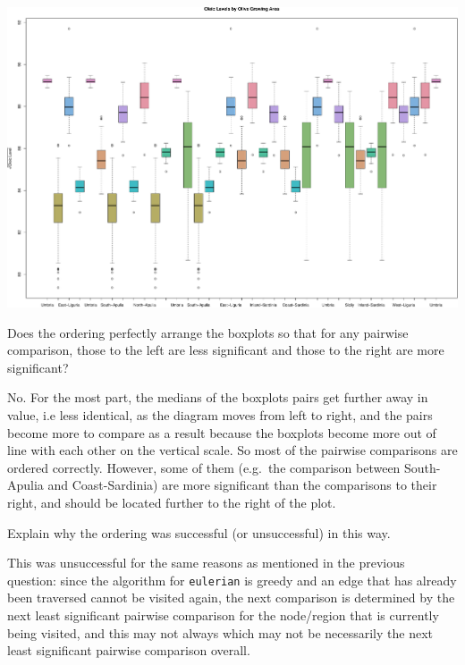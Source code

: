 \documentclass[9pt,letter]{article}
\begin{document}
\begin{center}\includegraphics{a4_solutions_files/figure-latex/unnamed-chunk-18-1} \end{center}

\item 

Does the ordering perfectly arrange the boxplots so that for any
pairwise comparison, those to the left are less significant and those to
the right are more significant?

No. For the most part, the medians of the boxplots pairs get further
away in value, i.e less identical, as the diagram moves from left to
right, and the pairs become more to compare as a result because the
boxplots become more out of line with each other on the vertical scale.
So most of the pairwise comparisons are ordered correctly. However, some
of them (e.g.~the comparison between South-Apulia and Coast-Sardinia)
are more significant than the comparisons to their right, and should be
located further to the right of the plot.

\item 

Explain why the ordering was successful (or unsuccessful) in this way.

This was unsuccessful for the same reasons as mentioned in the previous
question: since the algorithm for \texttt{eulerian} is greedy and an
edge that has already been traversed cannot be visited again, the next
comparison is determined by the next least significant pairwise
comparison for the node/region that is currently being visited, and this
may not always which may not be necessarily the next least significant
pairwise comparison overall.
\end{document}
